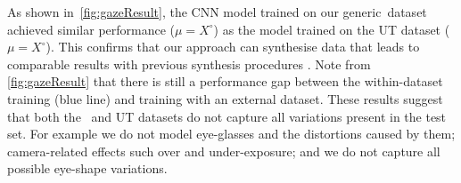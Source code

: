 As shown
in~\autoref{fig:gazeResult}, the CNN model trained on our generic~\dataset dataset achieved similar performance ($\mu\!=\!X^{\circ}$) as the model trained on the UT dataset ($\mu\!=\!X^{\circ}$).
This confirms that our approach can synthesise data that leads to comparable results with previous synthesis procedures \cite{sugano2014learning}.
Note from \autoref{fig:gazeResult} that there is still a performance gap between the within-dataset training (blue line) and training with an external dataset.
These results suggest that both the \dataset~and UT datasets do not capture all variations present in the test set. For example we do not model eye-glasses and the distortions caused by them; camera-related effects such over and under-exposure; and we do not capture all possible eye-shape variations.


